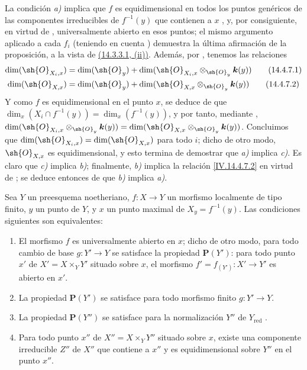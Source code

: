 La condición \emph{a)} implica que $f$ es equidimensional en todos los puntos genéricos de las componentes irreducibles de $f^{-1}(y)$ que contienen a $x$ , y, por consiguiente, en virtud de , universalmente abierto en esos puntos; el mismo argumento aplicado a cada $f_i$ (teniendo en cuenta ) demuestra la última afirmación de la proposición, a la vista de {\hyperlink{ega4.c04.subsec.14-3-3-1}{(14.3.3.1, (ii))}}.
Además, por , tenemos las relaciones
\begin{align}
  \dim(\sh{O}_{X_i,x}) &= \dim(\sh{O}_y) + \dim(\sh{O}_{X_i,x}\otimes_{\sh{O}_y}\boldsymbol{k}(y))
  \tag{14.4.7.1}\label{IV.14.4.7.1}\\
  \dim(\sh{O}_{X,x}) &= \dim(\sh{O}_y) + \dim(\sh{O}_{X,x}\otimes_{\sh{O}_y}\boldsymbol{k}(y))
  \tag{14.4.7.2}\label{IV.14.4.7.2}
\end{align}
Y como $f$ es equidimensional en el punto $x$, se deduce de  que $\dim_x(X_i\cap f^{-1}(y))=\dim_x(f^{-1}(y))$, y por tanto, mediante , $\dim(\sh{O}_{X_i,x}\otimes_{\sh{O}_y}\boldsymbol{k}(y))=\dim(\sh{O}_{X,x}\otimes_{\sh{O}_y}\boldsymbol{k}(y))$.
Concluimos que $\dim(\sh{O}_{X_i,x})=\dim(\sh{O}_{X,x})$ para todo $i$; dicho de otro modo, $\sh{O}_{X,x}$ es equidimensional, y esto termina de demostrar que \emph{a)} implica \emph{c)}.
Es claro que \emph{c)} implica \emph{b)}; finalmente, \emph{b)} implica la relación \eqref{IV.14.4.7.2} en virtud de ; se deduce entonces de  que \emph{b)} implica \emph{a)}.

\begin{proposition}[14.4.8]
\label{IV.14.4.8}
Sea $Y$ un preesquema noetheriano, $f:X\to Y$ un morfismo localmente de tipo finito, $y$ un punto de $Y$, y $x$ un punto maximal de $X_y=f^{-1}(y)$.
Las condiciones siguientes son equivalentes:
\begin{enumerate}[label=\emph{\alph*)}]
  \item El morfismo $f$ es universalmente abierto en $x$; dicho de otro modo, para \textup{todo} cambio de base $g:Y'\to Y$ se satisface la propiedad $\boldsymbol{P}(Y')$: para todo punto $x'$ de $X'=X\times_Y Y'$ situado sobre $x$, el morfismo $f'=f_{(Y')}:X'\to Y'$ es abierto en $x'$.
  \item[\emph{a$'$)}] La propiedad $\boldsymbol{P}(Y')$ se satisface para todo morfismo \textup{finito} $g:Y'\to Y$.
  \item[\emph{a$''$)}] La propiedad $\boldsymbol{P}(Y'')$ se satisface para la \textup{normalización} $Y''$ de $Y_{\mathrm{red}}$ .
  \item Para todo punto $x''$ de $X''=X\times_Y Y''$ situado sobre $x$, existe una componente irreducible $Z''$ de $X''$ que contiene a $x''$ y es equidimensional sobre $Y''$ en el punto $x''$.
\end{enumerate}
\end{proposition}

